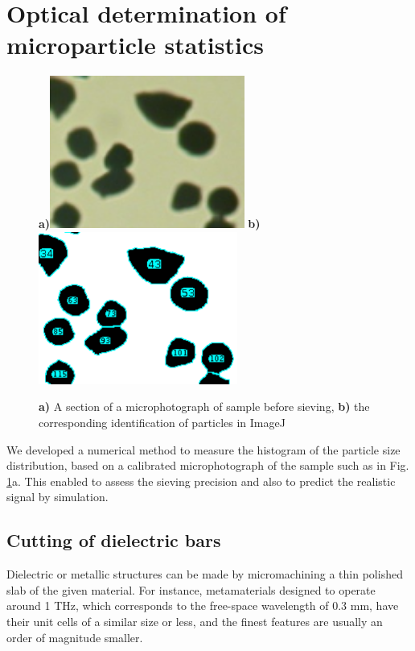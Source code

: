\section{Optical determination of microparticle statistics}
\begin{figure}[ht] \caption{\textbf{a)} A section of a microphotograph of sample before sieving, \textbf{b)} the corresponding identification of particles in ImageJ} \label{fg_sievingstats} \centering 
\textbf{a)}\includegraphics[height=5cm]{img/technology/imagej_photo.pdf}
\textbf{b)}\includegraphics[height=5cm]{img/technology/imagej_found.pdf}
\end{figure}

We developed a numerical method to measure the histogram of the particle size distribution, based on a calibrated microphotograph of the sample such as in Fig. \ref{fg_sievingstats}a. This enabled to assess the sieving precision and also to predict the realistic signal by simulation.

\subsection{Cutting of dielectric bars}%
Dielectric or metallic structures can be made by micromachining a thin polished slab of the given material. For instance, metamaterials designed to operate around 1 THz, which corresponds to the free-space wavelength of 0.3 mm, have their unit cells of a similar size or less, and the finest features are usually an order of magnitude smaller. 

